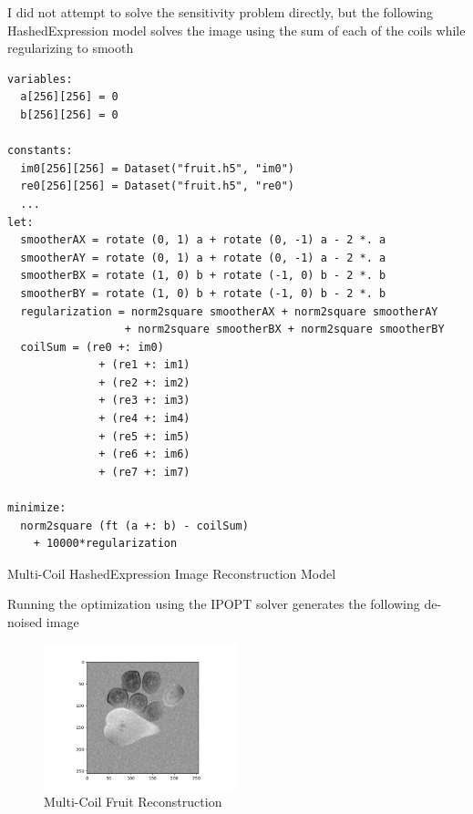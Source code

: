 \documentclass[11pt]{article}
\begin{document}
I did not attempt to solve the sensitivity problem directly, but the following
HashedExpression model solves the image using the sum of each of the coils
while regularizing to smooth
\begin{listing}[htbp]
\begin{verbatim}
variables:
  a[256][256] = 0
  b[256][256] = 0

constants:
  im0[256][256] = Dataset("fruit.h5", "im0")
  re0[256][256] = Dataset("fruit.h5", "re0")
  ...
let:
  smootherAX = rotate (0, 1) a + rotate (0, -1) a - 2 *. a
  smootherAY = rotate (0, 1) a + rotate (0, -1) a - 2 *. a
  smootherBX = rotate (1, 0) b + rotate (-1, 0) b - 2 *. b
  smootherBY = rotate (1, 0) b + rotate (-1, 0) b - 2 *. b
  regularization = norm2square smootherAX + norm2square smootherAY
                  + norm2square smootherBX + norm2square smootherBY
  coilSum = (re0 +: im0)
              + (re1 +: im1)
              + (re2 +: im2)
              + (re3 +: im3)
              + (re4 +: im4)
              + (re5 +: im5)
              + (re6 +: im6)
              + (re7 +: im7)

minimize:
  norm2square (ft (a +: b) - coilSum)
    + 10000*regularization
\end{verbatim}
\caption{Multi-Coil HashedExpression Image Reconstruction Model}
\end{listing}

\newpage
Running the optimization using the IPOPT solver generates the following
de-noised image

\begin{figure}[!htpb]
\centering
\includegraphics[width=0.5\textwidth]{figs/FruitReconstruction.png}
\caption{\label{fig:FruitReconstruction}Multi-Coil Fruit Reconstruction}
\end{figure}
\end{document}
